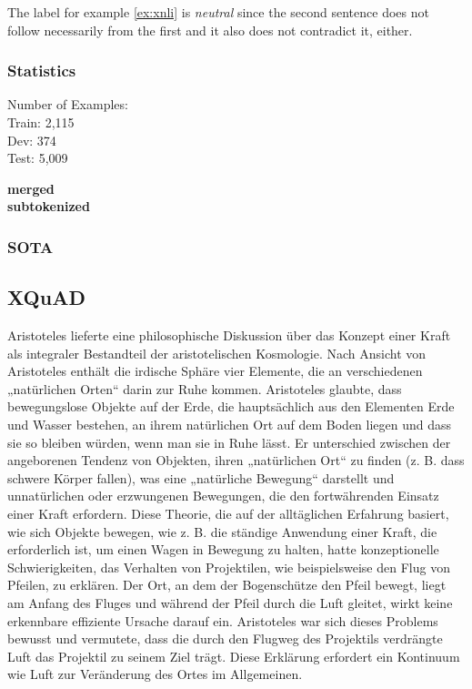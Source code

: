 The label for example \ref{ex:xnli} is \emph{neutral} since the second sentence does not follow necessarily from the first and it also does not contradict it, either.

\subsubsection{Statistics}

Number of Examples: \\
Train: 2,115 \\
Dev: 374 \\
Test: 5,009

\textbf{merged} \\

\textbf{subtokenized} \\

\subsubsection{SOTA}

\subsection{XQuAD}

\begin{examples}
	\label{ex:xquad}
	\item Aristoteles lieferte eine philosophische Diskussion über das Konzept einer Kraft als integraler Bestandteil der aristotelischen Kosmologie. Nach Ansicht von Aristoteles enthält die irdische Sphäre vier Elemente, die an verschiedenen „natürlichen Orten“ darin zur Ruhe kommen. Aristoteles glaubte, dass bewegungslose Objekte auf der Erde, die hauptsächlich aus den Elementen Erde und Wasser bestehen, an ihrem natürlichen Ort auf dem Boden liegen und dass sie so bleiben würden, wenn man sie in Ruhe lässt. Er unterschied zwischen der angeborenen Tendenz von Objekten, ihren „natürlichen Ort“ zu finden (z. B. dass schwere Körper fallen), was eine „natürliche Bewegung“ darstellt und unnatürlichen oder erzwungenen Bewegungen, die den fortwährenden Einsatz einer Kraft erfordern. Diese Theorie, die auf der alltäglichen Erfahrung basiert, wie sich Objekte bewegen, wie z. B. die ständige Anwendung einer Kraft, die erforderlich ist, um einen Wagen in Bewegung zu halten, hatte konzeptionelle Schwierigkeiten, das Verhalten von Projektilen, wie beispielsweise den Flug von Pfeilen, zu erklären. Der Ort, an dem der Bogenschütze den Pfeil bewegt, liegt am Anfang des Fluges und während der Pfeil durch die Luft gleitet, wirkt keine erkennbare effiziente Ursache darauf ein. Aristoteles war sich dieses Problems bewusst und vermutete, dass die durch den Flugweg des Projektils verdrängte Luft das Projektil zu seinem Ziel trägt. Diese Erklärung erfordert ein Kontinuum wie Luft zur Veränderung des Ortes im Allgemeinen.
\end{examples}


